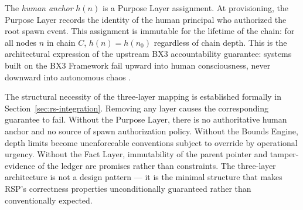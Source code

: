 The \emph{human anchor} $h(n)$ is a Purpose Layer assignment. At provisioning, the Purpose Layer records the identity of the human principal who authorized the root spawn event. This assignment is immutable for the lifetime of the chain: for all nodes $n$ in chain $C$, $h(n) = h(n_0)$ regardless of chain depth. This is the architectural expression of the upstream BX3 accountability guarantee: systems built on the BX3 Framework fail upward into human consciousness, never downward into autonomous chaos \cite{bx3framework2026, bailoutprotocol2026}.

The structural necessity of the three-layer mapping is established formally in Section~\ref{sec:rs-integration}. Removing any layer causes the corresponding guarantee to fail. Without the Purpose Layer, there is no authoritative human anchor and no source of spawn authorization policy. Without the Bounds Engine, depth limits become unenforceable conventions subject to override by operational urgency. Without the Fact Layer, immutability of the parent pointer and tamper-evidence of the ledger are promises rather than constraints. The three-layer architecture is not a design pattern --- it is the minimal structure that makes RSP's correctness properties unconditionally guaranteed rather than conventionally expected.